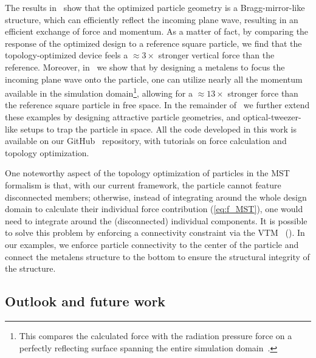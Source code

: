 The results in~ show that the optimized particle geometry is a Bragg-mirror-like
structure, which can efficiently reflect the incoming plane wave, resulting in an efficient exchange of force and momentum. As a matter of fact, by comparing the response of the optimized design
to a reference square particle, we find that the topology-optimized device feels a $\approx 3\times$ stronger vertical force than the reference.
 Moreover, in~\cite{ownpub2} we show that by designing a metalens to focus the incoming plane wave onto the particle, one can utilize nearly all the momentum available in the simulation domain\footnote{This compares the calculated force with the radiation pressure force on a perfectly reflecting surface spanning the entire simulation domain~\cite{ownpub2}.},
 allowing for a $\approx 13\times$ stronger force than the reference square particle in free space. 
 In the remainder of~\cite{ownpub2} we further extend these examples by designing
attractive particle geometries, and optical-tweezer-like setups to trap the particle in space. All the code developed in this work is available on our GitHub~\cite{github_MST} repository, with tutorials on force calculation and topology optimization. 

One noteworthy aspect of the topology optimization of particles in the MST formalism is that, with our current framework, the particle cannot feature disconnected members; otherwise, instead of integrating around the whole design domain to calculate their individual force contribution (\eqref{eq:f_MST}),
one would need to integrate around the (disconnected) individual components. It is possible to solve this problem by enforcing 
a connectivity constraint via the VTM~\cite{li_structural_2016} (). In our examples,
we enforce particle connectivity to the center of the particle and connect the metalens structure to the bottom to ensure the structural
integrity of the structure.

\subsection*{Outlook and future work}

